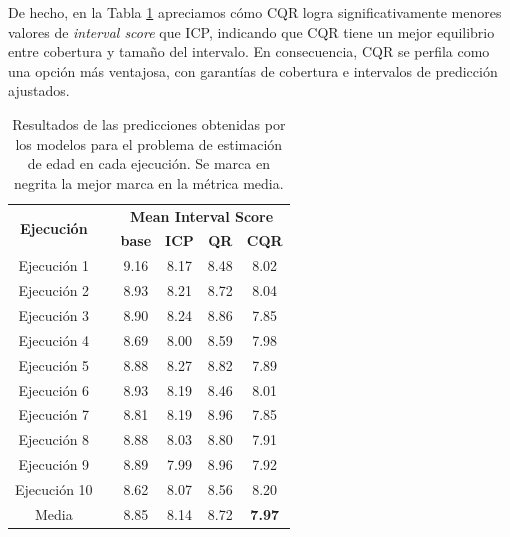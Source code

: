 De hecho, en la Tabla \ref{tab:AE_MIS_comparative} apreciamos cómo CQR logra significativamente menores valores de \textit{interval score} que ICP, indicando que CQR tiene un mejor equilibrio entre cobertura y tamaño del intervalo. En consecuencia, CQR se perfila como una opción más ventajosa, con garantías de cobertura e intervalos de predicción ajustados. 

\renewcommand{\arraystretch}{1.4}
\begin{table}[htbp]
    \small \centering
    \begin{tabular}{cccccc}
    \toprule
    \multirow{2}{*}{\textbf{Ejecución}} &  & \multicolumn{4}{c}{\textbf{Mean Interval Score}} \\ \cline{3-6} 
    &  & \textbf{base} & \textbf{ICP} & \textbf{QR} & \textbf{CQR} \\ \cline{1-1} \cline{3-6} 
    Ejecución  1 &  & 9.16 & 8.17 & 8.48 & 8.02 \\
    Ejecución  2 &  & 8.93 & 8.21 & 8.72 & 8.04 \\
    Ejecución  3 &  & 8.90 & 8.24 & 8.86 & 7.85 \\
    Ejecución  4 &  & 8.69 & 8.00 & 8.59 & 7.98 \\
    Ejecución  5 &  & 8.88 & 8.27 & 8.82 & 7.89 \\
    Ejecución  6 &  & 8.93 & 8.19 & 8.46 & 8.01 \\
    Ejecución  7 &  & 8.81 & 8.19 & 8.96 & 7.85 \\
    Ejecución  8 &  & 8.88 & 8.03 & 8.80 & 7.91 \\
    Ejecución  9 &  & 8.89 & 7.99 & 8.96 & 7.92 \\
    Ejecución 10 &  & 8.62 & 8.07 & 8.56 & 8.20 \\ \cline{1-1} \cline{3-6} 
    Media        &  & 8.85 & 8.14 & 8.72 & \textbf{7.97} \\ 
    \bottomrule
    \end{tabular}
    \caption[
        Resultados de las predicciones obtenidas por los modelos para el problema de estimación de edad en cada ejecución.
    ]{   
        Resultados de las predicciones obtenidas por los modelos para el problema de estimación de edad en cada ejecución.
        Se marca en negrita la mejor marca en la métrica media.
    }
    \label{tab:AE_MIS_comparative}
\end{table}


